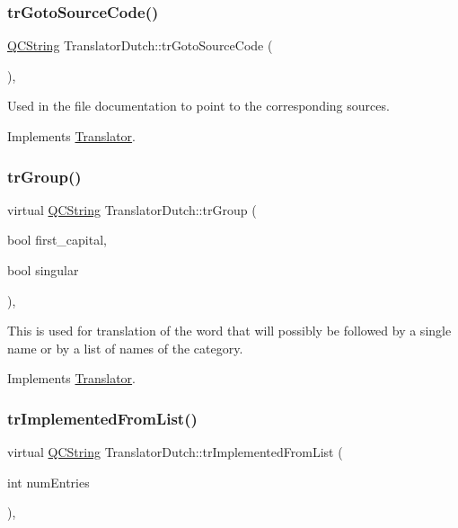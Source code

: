 \subsubsection{\texorpdfstring{trGotoSourceCode()}{trGotoSourceCode()}}
{\footnotesize\ttfamily \mbox{\hyperlink{class_q_c_string}{Q\+C\+String}} Translator\+Dutch\+::tr\+Goto\+Source\+Code (\begin{DoxyParamCaption}{ }\end{DoxyParamCaption})\hspace{0.3cm}{\ttfamily [inline]}, {\ttfamily [virtual]}}

Used in the file documentation to point to the corresponding sources. 

Implements \mbox{\hyperlink{class_translator}{Translator}}.

\mbox{\label{class_translator_dutch_a2ca257473515f26db8261213517f76ae}} 
\subsubsection{\texorpdfstring{trGroup()}{trGroup()}}
{\footnotesize\ttfamily virtual \mbox{\hyperlink{class_q_c_string}{Q\+C\+String}} Translator\+Dutch\+::tr\+Group (\begin{DoxyParamCaption}\item[{bool}]{first\+\_\+capital,  }\item[{bool}]{singular }\end{DoxyParamCaption})\hspace{0.3cm}{\ttfamily [inline]}, {\ttfamily [virtual]}}

This is used for translation of the word that will possibly be followed by a single name or by a list of names of the category. 

Implements \mbox{\hyperlink{class_translator}{Translator}}.

\mbox{\label{class_translator_dutch_ad4a24b2a365f4f1dcb14bf46eee42cef}} 
\subsubsection{\texorpdfstring{trImplementedFromList()}{trImplementedFromList()}}
{\footnotesize\ttfamily virtual \mbox{\hyperlink{class_q_c_string}{Q\+C\+String}} Translator\+Dutch\+::tr\+Implemented\+From\+List (\begin{DoxyParamCaption}\item[{int}]{num\+Entries }\end{DoxyParamCaption})\hspace{0.3cm}{\ttfamily [inline]}, {\ttfamily [virtual]}}

